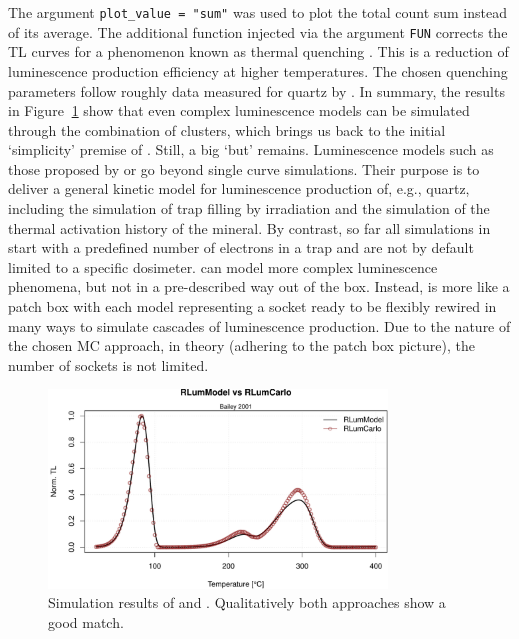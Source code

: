 The argument \texttt{plot\_value\ =\ "sum"} was used to plot the total
count sum instead of its average. The additional function injected via
the argument \texttt{FUN} corrects the TL curves for a phenomenon known
as thermal quenching \citep{Wintle_1975kx}. This is a reduction of
luminescence production efficiency at higher temperatures. The chosen
quenching parameters follow roughly data measured for quartz by
\citet{Friedrich:2018ha}. In summary, the results in Figure\(~\)
\ref{fig:Fig7} show that even complex luminescence models can be
simulated through the combination of clusters, which brings us back to
the initial `simplicity' premise of . Still, a big
`but' remains. Luminescence models such as those proposed by
\citet{Bailey_2001yo} or \citet{Pagonis:2008bl} go beyond single curve
simulations. Their purpose is to deliver a general kinetic model for
luminescence production of, e.g., quartz, including the simulation of
trap filling by irradiation and the simulation of the thermal activation
history of the mineral. By contrast, so far all simulations in
 start with a predefined number of electrons in a
trap and are not by default limited to a specific dosimeter.
 can model more complex luminescence phenomena, but
not in a pre-described way out of the box. Instead, 
is more like a patch box with each model representing a socket ready to
be flexibly rewired in many ways to simulate cascades of luminescence
production. Due to the nature of the chosen MC approach, in theory
(adhering to the patch box picture), the number of sockets is not
limited.

\begin{Schunk}
\begin{figure}

{\centering \includegraphics[width=90mm]{figures/Fig7-1} 

}

\caption[Simulation results of  and ]{Simulation results of  and . Qualitatively both approaches show a good match.}\label{fig:Fig7}
\end{figure}
\end{Schunk}

